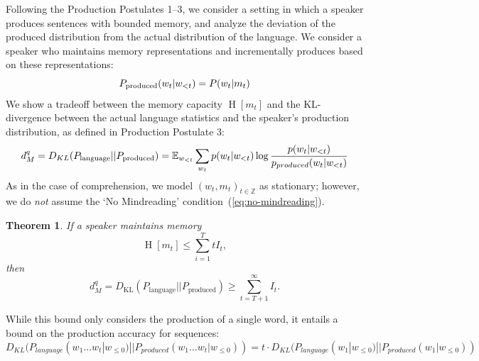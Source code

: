 \documentclass[11pt,letterpaper]{article}
\newcommand{\E}[0]{\mathbb{E}}
\newcounter{theorem}
\newtheorem{thm}[theorem]{Theorem}
\begin{document}
Following the Production Postulates 1--3, we consider a setting in which a speaker produces sentences with bounded memory, and analyze the deviation of the produced distribution from the actual distribution of the language.
We consider a speaker who maintains memory representations and incrementally produces based on these representations:
\begin{equation}
P_\text{produced}(w_t|w_{<t}) = P(w_t|m_t) \\
\end{equation}
We show a tradeoff between the memory capacity $\operatorname{H}[m_t]$ and the KL-divergence between the actual language statistics and the speaker's production distribution, as defined in Production Postulate 3:
\begin{equation}
d^q_M = D_{KL}(P_\text{language}||P_\text{produced})  = \E_{w_{<t}} \sum_{w_t} p(w_t|w_{<t}) \log \frac{p(w_t|w_{<t})}{p_{produced}(w_t|w_{<t})} \\
\end{equation}
As in the case of comprehension, we model $(w_t, m_t)_{t\in \mathbb{Z}}$ as stationary; however, we do \emph{not} assume the `No Mindreading' condition~(\ref{eq:no-mindreading}).

\begin{thm}
If a speaker maintains memory
	\begin{equation}
		\operatorname{H}[m_t] \leq \sum_{i=1}^T tI_t,
	\end{equation}
	then 
\begin{equation}
d^q_M = 	D_{\text{KL}}(P_\text{language}||P_\text{produced}) \geq \sum_{t=T+1}^\infty I_t.
\end{equation}
\end{thm}

While this bound only considers the production of a single word, it entails a bound on the production accuracy for sequences:
\begin{equation}
	D_{KL}(P_{language}(w_1\dots w_t|w_{\leq 0})||P_{produced}(w_1\dots w_t|w_{\leq 0}))  = t \cdot D_{KL}(P_{language}(w_1|w_{\leq 0})||P_{produced}(w_1|w_{\leq 0}))
\end{equation}
\end{document}
